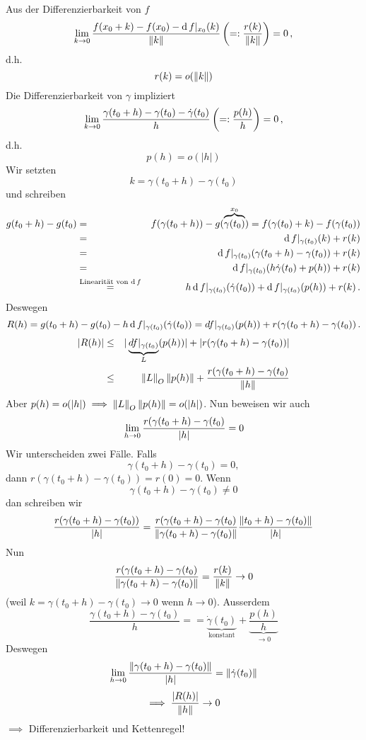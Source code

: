 \begin{Bew}
Aus der Differenzierbarkeit von $f$
  \[\displaystyle\lim_{k\rightarrow0}\frac{f(x_0+k)-f(x_0)-\operatorname{d} f|_{x_0}(k)}{\left\| k \right\|}\left( =: \frac{r(k)}{\left\| k \right\|} \right)=0\, ,\]
d.h.
  \[r(k)=o(\left\| k \right\|)\]
Die  Differenzierbarkeit von $\gamma$ impliziert
  \[\displaystyle\lim_{k\rightarrow0}\frac{\gamma(t_0+h)-\gamma(t_0) - \dot{\gamma} (t_0)}{h}
\left( =:\frac{p(h)}{h} \right)=0\, ,\]
d.h.
\[p(h)=o(|h|)\]
Wir setzten
\[k = \gamma(t_0+h) - \gamma (t_0)
\]
und schreiben
 \begin{eqnarray*}
g(t_0+h)-g(t_0) &=& f(\gamma(t_0+h))-g(\overbrace{\gamma(t_0)}^{x_0})=
f(\gamma(t_0)+k)-f(\gamma(t_0))\nonumber\\
&=&\operatorname{d} f|_{\gamma(t_0)}(k)+r(k)\nonumber\\
&=&\operatorname{d} f|_{\gamma(t_0)}(\gamma(t_0+h)-\gamma(t_0))+r(k)\nonumber\\
&=&\operatorname{d} f|_{\gamma(t_0)}(h\dot\gamma(t_0)+p(h))+r(k)\nonumber\\
&\stackrel{\text{Linearität von $\operatorname{d} f$}}{=}& h\operatorname{d} f|_{\gamma(t_0)}(\dot\gamma(t_0))+\operatorname{d} f|_{\gamma(t_0)}(p(h))+r(k)\, .
\end{eqnarray*}
Deswegen
\[
R(h) = g(t_0+h)-g(t_0)-h\operatorname{d} f|_{\gamma(t_0)}(\dot\gamma(t_0))
=df|_{\gamma(t_0)}(p(h))+r(\gamma(t_0+h)-\gamma(t_0))\, .
\]
\begin{eqnarray*}
\left| R(h) \right| &\leq& 
|\underbrace{df|_{\gamma(t_0)}}_L (p(h))|+|r(\gamma(t_0+h)-\gamma(t_0))|\nonumber\\
&\leq&\left\| L \right\|_O \|p(h)\|+\frac{r(\gamma(t_0+h)-\gamma(t_0)}{\left\| h \right\|}
\end{eqnarray*}
Aber $p(h)= o (|h|) \implies \left\| L \right\|_O \|p(h)\| = o(|h|)$. Nun beweisen wir auch
  \[\displaystyle\lim_{h\rightarrow0}\frac{r(\gamma(t_0+h)-\gamma(t_0)}{\left| h \right|} = 0\]
Wir unterscheiden zwei F\"alle. Falls 
  \[\gamma(t_0+h)-\gamma(t_0)=0,\]
  dann $r (\gamma(t_0+h)-\gamma(t_0))= r(0)=0$. Wenn 
  \[\gamma(t_0+h)-\gamma(t_0)\neq 0\]
dan schreiben wir
\[
\frac{r (\gamma(t_0+h)-\gamma(t_0))}{|h|} =\frac{r(\gamma(t_0+h)-\gamma(t_0)}{\left\| \gamma(t_0+h)-\gamma(t_0) \right\|}\frac{\left\| t_0+h)-\gamma(t_0) \right\|}{\left| h \right|}
\]
Nun  \[\frac{r(\gamma(t_0+h)-\gamma(t_0)}{\left\| \gamma(t_0+h)-\gamma(t_0) \right\|}=\frac{r(k)}{\left\| k \right\|}\rightarrow 0\]
(weil $k= \gamma(t_0+h)-\gamma(t_0)\to 0$ wenn $h\to 0$). 
Ausserdem
\[
\frac{\gamma (t_0+h)-\gamma(t_0)}{h} = =\underbrace{\dot\gamma(t_0)}_{\text{konstant}}+\underbrace{\frac{p(h)}{h}}_{\to 0}
\]
  Deswegen
  \[\displaystyle\lim_{h\rightarrow0}\frac{\left\| \gamma(t_0+h)-\gamma(t_0) \right\|}{\left| h \right|}=\left\| \dot\gamma(t_0) \right\|\]
  \[\implies \frac{\left| R(h) \right|}{\left\| h \right\|}\rightarrow 0\]
  $\implies$ Differenzierbarkeit und Kettenregel!
\end{Bew}

